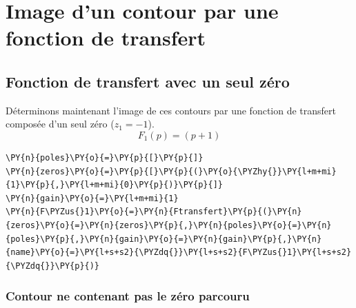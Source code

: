 \section{Image d'un contour par une fonction de transfert
\label{image-dun-contour-par-une-fonction-de-transfert}}
\subsection{Fonction de transfert avec un seul zéro
\label{fonction-de-transfert-avec-un-seul-zuxe9ro}}
Déterminons maintenant l'image de ces contours par une fonction de
transfert composée d'un seul zéro (\(z_1=-1\)).
\[
F_1(p)=(p+1)
\]
\begin{tcolorbox}[breakable, size=fbox, boxrule=1pt, pad at break*=1mm,colback=cellbackground, colframe=cellborder]
\begin{Verbatim}[commandchars=\\\{\}]
\PY{n}{poles}\PY{o}{=}\PY{p}{[}\PY{p}{]}
\PY{n}{zeros}\PY{o}{=}\PY{p}{[}\PY{p}{(}\PY{o}{\PYZhy{}}\PY{l+m+mi}{1}\PY{p}{,}\PY{l+m+mi}{0}\PY{p}{)}\PY{p}{]}
\PY{n}{gain}\PY{o}{=}\PY{l+m+mi}{1}
\PY{n}{F\PYZus{}1}\PY{o}{=}\PY{n}{Ftransfert}\PY{p}{(}\PY{n}{zeros}\PY{o}{=}\PY{n}{zeros}\PY{p}{,}\PY{n}{poles}\PY{o}{=}\PY{n}{poles}\PY{p}{,}\PY{n}{gain}\PY{o}{=}\PY{n}{gain}\PY{p}{,}\PY{n}{name}\PY{o}{=}\PY{l+s+s2}{\PYZdq{}}\PY{l+s+s2}{F\PYZus{}1}\PY{l+s+s2}{\PYZdq{}}\PY{p}{)}
\end{Verbatim}
\end{tcolorbox}
\subsubsection{Contour ne contenant pas le zéro parcouru\label{contour-nentourant-pas-le-zuxe9ro-parcouru}}
